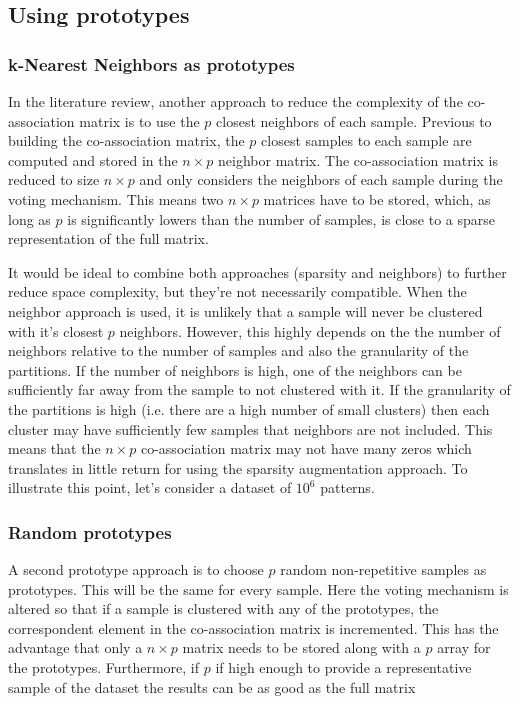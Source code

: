 \subsection{Using prototypes}

\subsubsection{k-Nearest Neighbors as prototypes}
In the literature review, another approach to reduce the complexity of the co-association matrix is to use the $p$ closest neighbors of each sample. Previous to building the co-association matrix, the $p$ closest samples to each sample are computed and stored in the $n \times p$ neighbor matrix. The co-association matrix is reduced to size $n \times p$ and only considers the neighbors of each sample during the voting mechanism. This means two $n \times p$ matrices have to be stored, which, as long as $p$ is significantly lowers than the number of samples, is close to a sparse representation of the full matrix.

 It would be ideal to combine both approaches (sparsity and neighbors) to further reduce space complexity, but they're not necessarily compatible. When the neighbor approach is used, it is unlikely that a sample will never be clustered with it's closest $p$ neighbors. However, this highly depends on the the number of neighbors relative to the number of samples and also the granularity of the partitions. If the number of neighbors is high, one of the neighbors can be sufficiently far away from the sample to not clustered with it. If the granularity of the partitions is high (i.e. there are a high number of small clusters) then each cluster may have sufficiently few samples that neighbors are not included. This means that the $n \times p$ co-association matrix may not have many zeros which translates in little return for using the sparsity augmentation approach. To illustrate this point, let's consider a dataset of $10^6$ patterns. 


\subsubsection{Random prototypes}
A second prototype approach is to choose $p$ random non-repetitive samples as prototypes. This will be the same for every sample.
Here the voting mechanism is altered so that if a sample is clustered with any of the prototypes, the correspondent element in the co-association matrix is incremented. This has the advantage that only a $n \times p$ matrix needs to be stored along with a $p$ array for the prototypes.
Furthermore, if $p$ if high enough to provide a representative sample of the dataset the results can be as good as the full matrix

